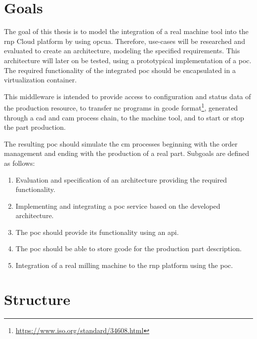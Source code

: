 \documentclass[
a4paper,
twoside,
headsepline,
cleardoublepage=empty,
parskip=half,
draft=false
]{scrbook}
\begin{document}
		\section{Goals}\label{sec:goals}

			The goal of this thesis is to model the integration of a real machine tool into the \gls{rnp} Cloud platform by using \gls{opcua}.
			Therefore, use-cases will be researched and evaluated to create an architecture, modeling the specified requirements.
			This architecture will later on be tested, using a prototypical implementation of a \gls{poc}.
			The required functionality of the integrated \gls{poc} should be encapsulated in a virtualization container.
			
			This middleware is intended to provide access to configuration and status data of the production resource, to transfer \gls{nc} programs in \gls{gcode} format\footnote{\url{https://www.iso.org/standard/34608.html}}, generated through a \gls{cad} and \gls{cam} process chain, to the machine tool, and to start or stop the part production. 
			
	\newpage
			
			The resulting \gls{poc} should simulate the \gls{cm} processes beginning with the order management and ending with the production of a real part. Subgoals are defined as follows:

			\begin{enumerate}

				\item Evaluation and specification of an architecture providing the required functionality.

				\item Implementing and integrating a \gls{poc} service based on the developed architecture.
				
				\item The \gls{poc} should provide its functionality using an \gls{api}.

				\item The \gls{poc} should be able to store \gls{gcode} for the production part description.

				\item Integration of a real milling machine to the \gls{rnp} platform using the \gls{poc}.

			\end{enumerate}

		\section{Structure}
\end{document}
